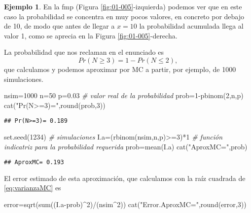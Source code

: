 \documentclass[
]{book}
\newenvironment{Shaded}{\begin{snugshade}}{\end{snugshade}}
\newcommand{\CommentTok}[1]{\textcolor[rgb]{0.56,0.35,0.01}{\textit{#1}}}
\newcommand{\DecValTok}[1]{\textcolor[rgb]{0.00,0.00,0.81}{#1}}
\newcommand{\FloatTok}[1]{\textcolor[rgb]{0.00,0.00,0.81}{#1}}
\newcommand{\FunctionTok}[1]{\textcolor[rgb]{0.00,0.00,0.00}{#1}}
\newcommand{\NormalTok}[1]{#1}
\newcommand{\OtherTok}[1]{\textcolor[rgb]{0.56,0.35,0.01}{#1}}
\newcommand{\SpecialCharTok}[1]{\textcolor[rgb]{0.00,0.00,0.00}{#1}}
\newcommand{\StringTok}[1]{\textcolor[rgb]{0.31,0.60,0.02}{#1}}
\theoremstyle{definition}
\theoremstyle{definition}
\newtheorem{example}{Ejemplo}[chapter]
\theoremstyle{definition}
\theoremstyle{definition}
\theoremstyle{remark}
\begin{document}
\begin{example}
En la fmp (Figura \ref{fig:01-005}-izquierda) podemos ver que en este caso la probabilidad se concentra en muy pocos valores, en concreto por debajo de 10, de modo que antes de llegar a \(x=10\) la probabilidad acumulada llega al valor 1, como se aprecia en la Figura \ref{fig:01-005}-derecha.

La probabilidad que nos reclaman en el enunciado es \[Pr(N\geq 3)=1-Pr(N \leq 2),\] que calculamos y podemos aproximar por MC a partir, por ejemplo, de 1000 simulaciones.

\begin{Shaded}
\begin{Highlighting}[]
\NormalTok{nsim}\OtherTok{=}\DecValTok{1000}
\NormalTok{n}\OtherTok{=}\DecValTok{50}
\NormalTok{p}\OtherTok{=}\FloatTok{0.03}
\CommentTok{\# valor real de la probabilidad}
\NormalTok{prob}\OtherTok{=}\DecValTok{1}\SpecialCharTok{{-}}\FunctionTok{pbinom}\NormalTok{(}\DecValTok{2}\NormalTok{,n,p)}
\FunctionTok{cat}\NormalTok{(}\StringTok{"Pr(N\textgreater{}=3)="}\NormalTok{,}\FunctionTok{round}\NormalTok{(prob,}\DecValTok{3}\NormalTok{))}
\end{Highlighting}
\end{Shaded}

\begin{verbatim}
## Pr(N>=3)= 0.189
\end{verbatim}

\begin{Shaded}
\begin{Highlighting}[]
\FunctionTok{set.seed}\NormalTok{(}\DecValTok{1234}\NormalTok{)}
\CommentTok{\# simulaciones}
\NormalTok{I.a}\OtherTok{=}\NormalTok{(}\FunctionTok{rbinom}\NormalTok{(nsim,n,p)}\SpecialCharTok{\textgreater{}=}\DecValTok{3}\NormalTok{)}\SpecialCharTok{*}\DecValTok{1}  \CommentTok{\# función indicatriz para la probabilidad requerida}
\NormalTok{prob}\OtherTok{=}\FunctionTok{mean}\NormalTok{(I.a)}
\FunctionTok{cat}\NormalTok{(}\StringTok{"AproxMC="}\NormalTok{,prob)}
\end{Highlighting}
\end{Shaded}

\begin{verbatim}
## AproxMC= 0.193
\end{verbatim}

El error estimado de esta aproximación, que calculamos con la raíz cuadrada de \eqref{eq:varianzaMC} es

\begin{Shaded}
\begin{Highlighting}[]
\NormalTok{error}\OtherTok{=}\FunctionTok{sqrt}\NormalTok{(}\FunctionTok{sum}\NormalTok{((I.a}\SpecialCharTok{{-}}\NormalTok{prob)}\SpecialCharTok{\^{}}\DecValTok{2}\NormalTok{)}\SpecialCharTok{/}\NormalTok{(nsim}\SpecialCharTok{\^{}}\DecValTok{2}\NormalTok{))}
\FunctionTok{cat}\NormalTok{(}\StringTok{"Error.AproxMC="}\NormalTok{,}\FunctionTok{round}\NormalTok{(error,}\DecValTok{3}\NormalTok{))}
\end{Highlighting}
\end{Shaded}


\end{example}
\end{document}
